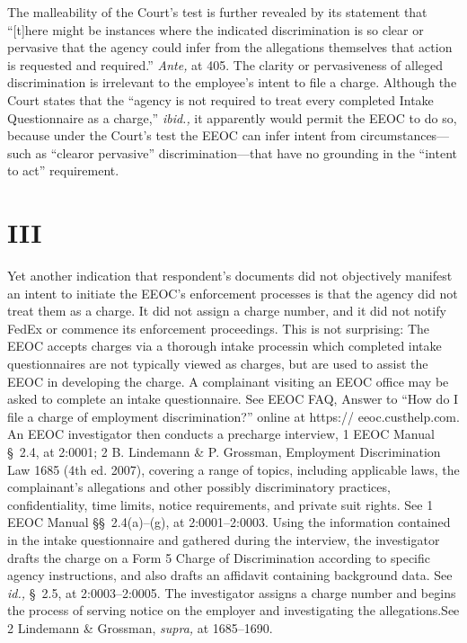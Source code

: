   The malleability of the Court's test is further revealed by its
statement that ``[t]here might be instances where the indicated
discrimination is so clear or pervasive that the agency could
infer from the allegations themselves that action is requested and
required.'' \emph{Ante,} at 405. The clarity or pervasiveness of
alleged discrimination is irrelevant to the employee's intent
to file a charge. Although the Court states that the ``agency
is not required to treat every completed Intake Questionnaire as
a charge,'' \emph{ibid.,} it apparently would permit the EEOC
to do so, because under the Court's test the EEOC can infer
intent from circumstances---such as ``clear\newpage  or pervasive''
discrimination---that have no grounding in the ``intent to act''
requirement.\footnotemark[5]

\section{III}

  Yet another indication that respondent's documents did not
objectively manifest an intent to initiate the EEOC's enforcement
processes is that the agency did not treat them as a charge. It did
not assign a charge number, and it did not notify FedEx or commence
its enforcement proceedings. This is not surprising: The EEOC accepts
charges via a thorough intake process\footnotemark[6] in which completed intake
questionnaires are not typically viewed as charges, but are used to
assist the EEOC in developing the charge. A complainant visiting an EEOC
office may be asked to complete an intake questionnaire. See EEOC FAQ,
Answer to ``How do I file a charge of employment discrimination?''
online at https:// eeoc.custhelp.com. An EEOC investigator then
conducts a precharge interview, 1 EEOC Manual \S~2.4, at 2:0001; 2 B.
Lindemann \& P. Grossman, Employment Discrimination \newpage  Law 1685 (4th
ed. 2007), covering a range of topics, including applicable laws, the
complainant's allegations and other possibly discriminatory practices,
confidentiality, time limits, notice requirements, and private suit
rights. See 1 EEOC Manual \S\S~2.4(a)--(g), at 2:0001--2:0003.
Using the information contained in the intake questionnaire and gathered
during the interview, the investigator drafts the charge on a Form 5
Charge of Discrimination according to specific agency instructions, and
also drafts an affidavit containing background data. See \emph{id.,}
\S~2.5, at 2:0003--2:0005. The investigator assigns a charge
number and begins the process of serving notice on the employer and
investigating the allegations.See 2 Lindemann \& Grossman, \emph{supra,}
at 1685--1690.

